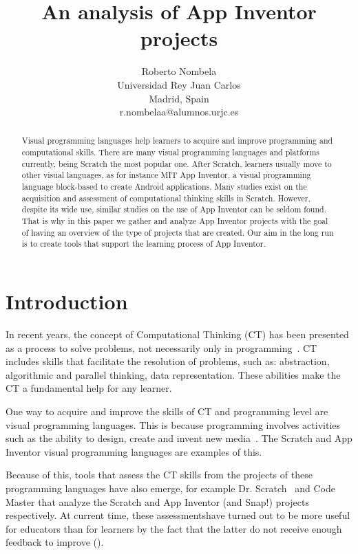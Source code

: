 \documentclass[a4paper]{article}
\title{An analysis of App Inventor projects}
\author{
Roberto Nombela \\ Universidad Rey Juan Carlos\\
                Madrid, Spain \\ r.nombelaa@alumnos.urjc.es
}
\begin{document}
\maketitle

\begin{abstract}
Visual programming languages help learners to acquire and improve programming and computational skills.
There are many visual programming languages and platforms currently, being Scratch the most popular one.
After Scratch, learners usually move to other visual languages, as for instance MIT App Inventor, a visual programming language block-based to create Android applications.
Many studies exist on the acquisition and assessment of computational thinking skills in Scratch.
However, despite its wide use, similar studies on the use of App Inventor can be seldom found.
That is why in this paper we gather and analyze App Inventor projects with the goal of having an overview of the type of projects that are created.
Our aim in the long run is to create tools that support the learning process of App Inventor.
\end{abstract}


\section{Introduction}

In recent years, the concept of Computational Thinking (CT) has been presented as a process to solve problems, not necessarily only in programming~\cite{wing2006computational}. 
CT includes skills that facilitate the resolution of problems, such as: abstraction, algorithmic and parallel thinking, data representation. These abilities make the CT a fundamental help for any learner.

One way to acquire and improve the skills of CT and programming level are visual programming languages.
This is because programming involves activities such as the ability to design, create and invent new media~\cite{resnick2009scratch}.
The Scratch and App Inventor visual programming languages are examples of this.

Because of this, tools that assess the CT skills from the projects of these programming languages have also emerge, for example Dr. Scratch~\cite{moreno2015dr} and Code Master that analyze the Scratch and App Inventor (and Snap!) projects respectively. 
At current time, these assessmentshave turned out to be more useful for educators than for learners by the fact that the latter do not receive enough feedback to improve (\cn).
\end{document}
